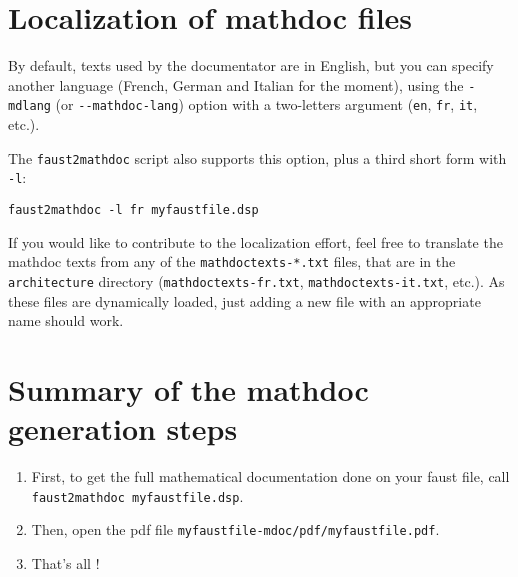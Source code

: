 \section{Localization of mathdoc files}
\label{localization-mdoc}

By default, texts used by the documentator are in English, but you can specify another language (French, German and Italian for the moment), using the \lstinline!-mdlang! (or \lstinline!--mathdoc-lang!) option with a two-letters argument (\lstinline!en!, \lstinline!fr!, \lstinline!it!, etc.).

The \lstinline!faust2mathdoc! script also supports this option, plus a third short form with \lstinline!-l!:
\begin{lstlisting}
faust2mathdoc -l fr myfaustfile.dsp
\end{lstlisting}

If you would like to contribute to the localization effort, feel free to translate the mathdoc texts from any of the \lstinline!mathdoctexts-*.txt! files, that are in the \lstinline!architecture! directory (\lstinline!mathdoctexts-fr.txt!, \lstinline!mathdoctexts-it.txt!, etc.). As these files are dynamically loaded, just adding a new file with an appropriate name should work.




\section{Summary of the mathdoc generation steps}
\label{mdoc-summary}

\begin{enumerate}
\item First, to get the full mathematical documentation done on your faust file, call \lstinline!faust2mathdoc myfaustfile.dsp!.
\item Then, open the pdf file \lstinline!myfaustfile-mdoc/pdf/myfaustfile.pdf!.
\item That's all !
\end{enumerate}



